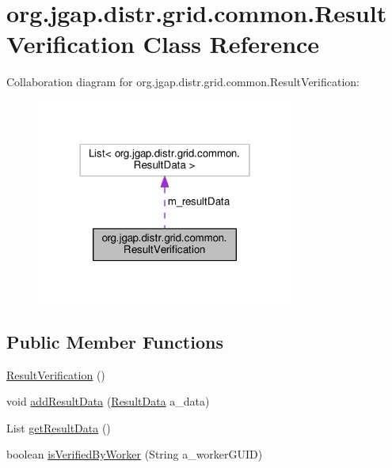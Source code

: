\hypertarget{classorg_1_1jgap_1_1distr_1_1grid_1_1common_1_1_result_verification}{\section{org.\-jgap.\-distr.\-grid.\-common.\-Result\-Verification Class Reference}
\label{classorg_1_1jgap_1_1distr_1_1grid_1_1common_1_1_result_verification}
}


Collaboration diagram for org.\-jgap.\-distr.\-grid.\-common.\-Result\-Verification\-:
\nopagebreak
\begin{figure}[H]
\begin{center}
\leavevmode
\includegraphics[width=240pt]{classorg_1_1jgap_1_1distr_1_1grid_1_1common_1_1_result_verification__coll__graph}
\end{center}
\end{figure}
\subsection*{Public Member Functions}
\begin{DoxyCompactItemize}
\item 
\hyperlink{classorg_1_1jgap_1_1distr_1_1grid_1_1common_1_1_result_verification_acb75226cbac92a18adeb35b7beb94830}{Result\-Verification} ()
\item 
void \hyperlink{classorg_1_1jgap_1_1distr_1_1grid_1_1common_1_1_result_verification_ac92a783ebf60fff978df6af89358dce9}{add\-Result\-Data} (\hyperlink{classorg_1_1jgap_1_1distr_1_1grid_1_1common_1_1_result_data}{Result\-Data} a\-\_\-data)
\item 
List \hyperlink{classorg_1_1jgap_1_1distr_1_1grid_1_1common_1_1_result_verification_a81d31c29b0e877d0cbfdb405eeca47fc}{get\-Result\-Data} ()
\item 
boolean \hyperlink{classorg_1_1jgap_1_1distr_1_1grid_1_1common_1_1_result_verification_a98351afef9f4e885c77c6dd8d727c40d}{is\-Verified\-By\-Worker} (String a\-\_\-worker\-G\-U\-I\-D)
\end{DoxyCompactItemize}
